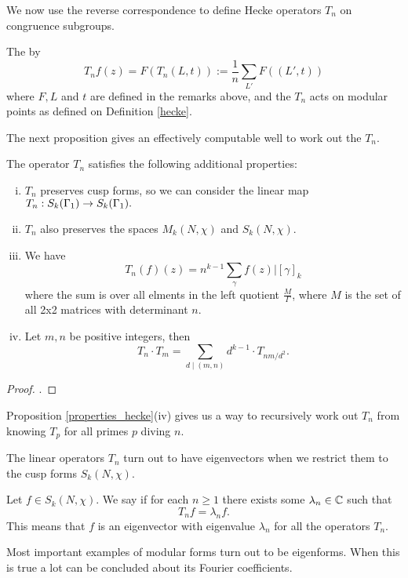 \documentclass[12pt, a4paper]{report}
\begin{document}
We now use the reverse correspondence to define Hecke operators $T_n$ on
congruence subgroups.

\begin{defn}
  The  by
  \[T_nf(z) = F(T_n(L,t)) := \frac{1}{n} \sum\limits_{L'} F((L',t))\]
  where $F, L$ and $t$ are defined in the remarks above, and the $T_n$ acts on
  modular points as defined on Definition \ref{hecke}.
\end{defn}

The next proposition gives an effectively computable well to work out the $T_n$. 

\begin{prop} \label{properties_hecke}
The operator $T_n$ satisfies the following additional properties:
  \begin{enumerate}[(i)]
  \item $T_n$ preserves cusp forms, so we can consider the linear map $T_n :
    S_k(\Gamma_1) \rightarrow S_k(\Gamma_1).$ 
  \item $T_n$ also preserves the spaces $M_k(N, \chi)$ and $S_k(N, \chi).$
  \item We have
    \[T_n(f)(z) = n^{k-1} \sum\limits_\gamma f(z) | [\gamma]_k \]
    where the sum is over all elments in the left quotient $\frac{M}{\Gamma}$,
    where $M$ is the set of all 2x2 matrices with determinant $n$.
  \item Let $m, n$ be positive integers, then
    \[T_n \cdot T_m = \sum\limits_{d \mid (m,n)} d^{k-1} \cdot T_{nm/d^2}.\]
  \end{enumerate}
\end{prop}
\begin{proof}
  \cite[Section 4.1.2, Pages 61-64]{modular}.
\end{proof}
Proposition \autoref{properties_hecke}(iv) gives us a way to recursively work out
$T_n$ from knowing $T_p$ for all primes $p$ diving $n$.

The linear operators $T_n$ turn out to have eigenvectors when we restrict them
to the cusp forms $S_k(N, \chi).$

\begin{defn}
  Let $f \in S_k(N, \chi).$ We say  if for each $n
  \geq 1$ there exists some $\lambda_n \in {\mathbb C}$ such that
  \[T_n f = \lambda_n f.\]
  This means that $f$ is an eigenvector with eigenvalue $\lambda_n$ for all the
  operators $T_n.$
\end{defn}

Most important examples of modular forms turn out to be eigenforms. When this is
true a lot can be concluded about its Fourier coefficients. 
\end{document}

